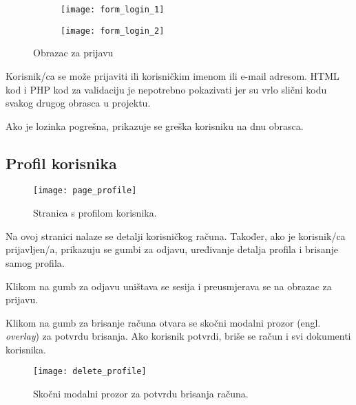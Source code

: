     \begin{figure}[h]
      \begin{subfigure}{0.5\textwidth}
        \texttt{[image: form\_login\_1]}
      \end{subfigure}
      \begin{subfigure}{0.5\textwidth}
        \texttt{[image: form\_login\_2]}
      \end{subfigure}

      \caption{Obrazac za prijavu}
    \end{figure}

    Korisnik/ca se može prijaviti ili korisničkim imenom ili e-mail adresom.
    HTML kod i PHP kod za validaciju je nepotrebno pokazivati jer su vrlo slični
    kodu svakog drugog obrasca u projektu.

    Ako je lozinka pogrešna, prikazuje se greška korisniku na dnu obrasca.

    

  \subsection{Profil korisnika}

    \begin{figure}[h]
      \texttt{[image: page\_profile]}
      \caption{Stranica s profilom korisnika.}
    \end{figure}

    Na ovoj stranici nalaze se detalji korisničkog računa. Također, ako je
    korisnik/ca prijavljen/a, prikazuju se gumbi za odjavu, uređivanje detalja
    profila i brisanje samog profila.

    Klikom na gumb za odjavu uništava se sesija i preusmjerava se na obrazac za
    prijavu.

    

    Klikom na gumb za brisanje računa otvara se skočni modalni prozor (engl.
    \textit{overlay}) za potvrdu brisanja. Ako korisnik potvrdi, briše se račun
    i svi dokumenti korisnika.

    

    \begin{figure}[h]
      \centering
      \texttt{[image: delete\_profile]}
      \caption{Skočni modalni prozor za potvrdu brisanja računa.}
    \end{figure}

